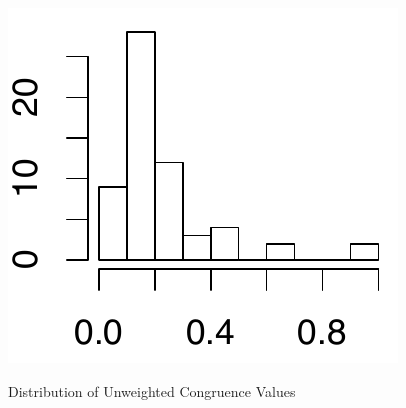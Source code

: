 \begin{figure}[t]
{	\includegraphics[scale=0.372]{figures/hist_unweighted_err}
     \label{subfig:hist_weighted_err}
  }
	\caption{Distribution of Unweighted Congruence Values}
	\label{fig:hist_unweighted_congruence}
\end{figure}

